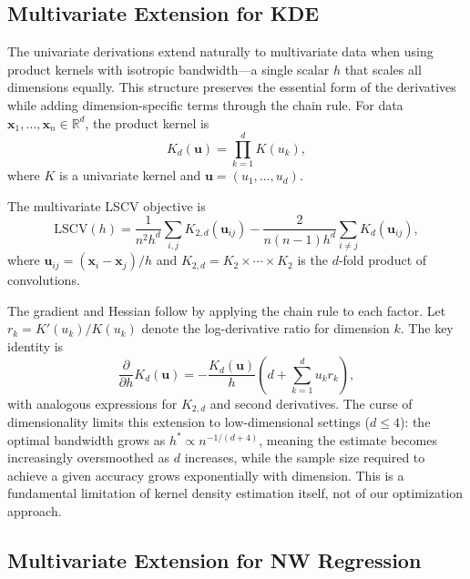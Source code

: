 \documentclass[11pt]{article}
\theoremstyle{definition}
\theoremstyle{remark}
\newcommand{\R}{\mathbb{R}}
\begin{document}
\subsection{Multivariate Extension for KDE}
\label{sec:multivariate}

The univariate derivations extend naturally to multivariate data when using product kernels with isotropic bandwidth---a single scalar $h$ that scales all dimensions equally.
This structure preserves the essential form of the derivatives while adding dimension-specific terms through the chain rule.
For data $\mathbf{x}_1, \ldots, \mathbf{x}_n \in \R^d$, the product kernel is
\begin{equation}
    K_d(\mathbf{u}) = \prod_{k=1}^{d} K(u_k),
\end{equation}
where $K$ is a univariate kernel and $\mathbf{u} = (u_1, \ldots, u_d)$.

The multivariate LSCV objective is
\begin{equation}
    \mathrm{LSCV}(h) = \frac{1}{n^2 h^d} \sum_{i,j} K_{2,d}(\mathbf{u}_{ij}) - \frac{2}{n(n-1)h^d} \sum_{i \neq j} K_d(\mathbf{u}_{ij}),
\end{equation}
where $\mathbf{u}_{ij} = (\mathbf{x}_i - \mathbf{x}_j)/h$ and $K_{2,d} = K_2 \times \cdots \times K_2$ is the $d$-fold product of convolutions.

The gradient and Hessian follow by applying the chain rule to each factor.
Let $r_k = K'(u_k)/K(u_k)$ denote the log-derivative ratio for dimension $k$.
The key identity is
\begin{equation}
    \frac{\partial}{\partial h} K_d(\mathbf{u}) = -\frac{K_d(\mathbf{u})}{h} \left( d + \sum_{k=1}^{d} u_k r_k \right),
\end{equation}
with analogous expressions for $K_{2,d}$ and second derivatives.
The curse of dimensionality limits this extension to low-dimensional settings ($d \leq 4$): the optimal bandwidth grows as $h^* \propto n^{-1/(d+4)}$, meaning the estimate becomes increasingly oversmoothed as $d$ increases, while the sample size required to achieve a given accuracy grows exponentially with dimension.
This is a fundamental limitation of kernel density estimation itself, not of our optimization approach.

\subsection{Multivariate Extension for NW Regression}
\label{sec:multivariate-nw}
\end{document}
